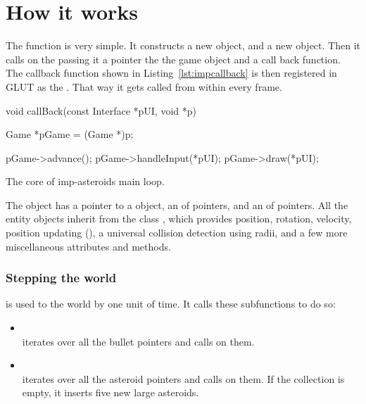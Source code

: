 \documentclass[
  digital, %
  color,   %
  table,   %
  oneside, %
  lof,     %
  lot,     %
]{fithesis3}
\begin{document}
{\section{How it works}
The  function is very simple. It constructs a new  object,
and a new  object. Then it calls  on the 
passing it a pointer the the game object and a call back function.
The callback function shown in Listing~\ref{lst:impcallback} is then registered in GLUT
as the . That way it gets called from within 
every frame.

\begin{listing}
\begin{cppblock}
void callBack(const Interface *pUI, void *p)
{
    Game *pGame = (Game *)p;

    pGame->advance();
    pGame->handleInput(*pUI);
    pGame->draw(*pUI);
}
\end{cppblock}
\caption{The core of imp-asteroids main loop.}
\label{lst:impcallback}
\end{listing}

The  object has a pointer to a  object, an 
of  pointers, and an  of  pointers.
All the entity objects inherit from the class , which provides position, rotation,
velocity, position updating (),
a universal collision detection using radii,
and a few more miscellaneous attributes and methods.

\subsubsection{Stepping the world}
 is used to  the world by one unit of time.
It calls these subfunctions to do so:
\begin{itemize}[--]
    \item {}\\
    iterates over all the bullet pointers and calls  on them.

    \item {}\\
    iterates over all the asteroid pointers and calls  on them.
    If the collection is empty, it inserts five new large asteroids.


\end{itemize}}
\end{document}
